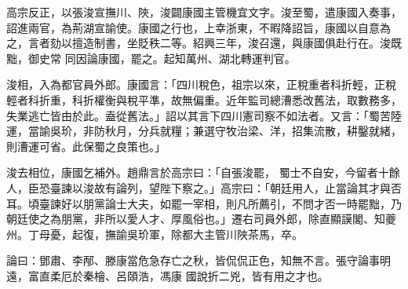 \begin{pinyinscope}
 高宗反正，以張浚宣撫川、陜，浚闢康國主管機宜文字。浚至蜀，遣康國入奏事，詔進兩官，為荊湖宣諭使。康國之行也，上幸浙東，不暇降詔旨，康國以自意為之，言者劾以擅造制書，坐貶秩二等。紹興三年，浚召還，與康國俱赴行在。浚既黜，御史常
 同因論康國，罷之。起知萬州、湖北轉運判官。



 浚相，入為都官員外郎。康國言：「四川稅色，祖宗以來，正稅重者科折輕，正稅輕者科折重，科折權衡與稅平準，故無偏重。近年監司總漕悉改舊法，取數務多，失業逃亡皆由於此。盍從舊法。」詔以其言下四川憲司察不如法者。又言：「蜀苦陸運，當諭吳玠，非防秋月，分兵就糧；兼選守牧治梁、洋，招集流散，耕鑿就緒，則漕運可省。此保蜀之良策也。」



 浚去相位，康國乞補外。趙鼎言於高宗曰：「自張浚罷，
 蜀士不自安，今留者十餘人，臣恐臺諫以浚故有論列，望陛下察之。」高宗曰：「朝廷用人，止當論其才與否耳。頃臺諫好以朋黨論士大夫，如罷一宰相，則凡所薦引，不問才否一時罷黜，乃朝廷使之為朋黨，非所以愛人才、厚風俗也。」遷右司員外郎，除直顯謨閣、知夔州。丁母憂，起復，撫諭吳玠軍，除都大主管川陜茶馬，卒。



 論曰：鄧肅、李邴、滕康當危急存亡之秋，皆侃侃正色，知無不言。張守論事明遠，富直柔厄於秦檜、呂頤浩，馮康
 國說折二兇，皆有用之才也。



\end{pinyinscope}